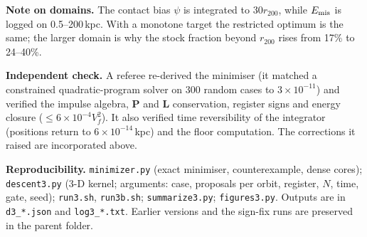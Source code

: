 \textbf{Note on domains.} The contact bias $\psi$ is integrated to $30r_{200}$, while $E_{\rm mis}$ is logged on 0.5--200\,kpc. With a monotone target the restricted optimum is the same; the larger domain is why the stock fraction beyond $r_{200}$ rises from 17\% to 24--40\%.

\textbf{Independent check.} A referee re-derived the minimiser (it matched a constrained quadratic-program solver on 300 random cases to $3\times10^{-11}$) and verified the impulse algebra, $\mathbf P$ and $\mathbf L$ conservation, register signs and energy closure ($\le6\times10^{-4}V_f^2$). It also verified time reversibility of the integrator (positions return to $6\times10^{-14}$\,kpc) and the floor computation. The corrections it raised are incorporated above.

\textbf{Reproducibility.} \texttt{minimizer.py} (exact minimiser, counterexample, dense cores); \texttt{descent3.py} (3-D kernel; arguments: case, proposals per orbit, register, $N$, time, gate, seed); \texttt{run3.sh}, \texttt{run3b.sh}; \texttt{summarize3.py}; \texttt{figures3.py}. Outputs are in \texttt{d3\_*.json} and \texttt{log3\_*.txt}. Earlier versions and the sign-fix runs are preserved in the parent folder.
